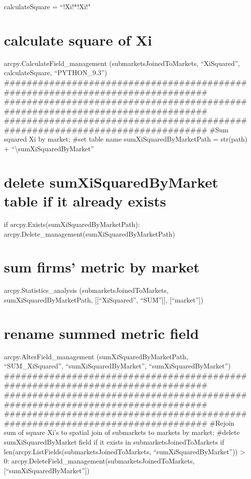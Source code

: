 \documentclass[]{article}
\begin{document}
calculateSquare = ``!Xi!*!Xi!"

\section{calculate square of Xi}\label{calculate-square-of-xi}

arcpy.CalculateField\_management (submarketsJoinedToMarkets,
``XiSquared'', calculateSquare, ``PYTHON\_9.3'')
\#\#\#\#\#\#\#\#\#\#\#\#\#\#\#\#\#\#\#\#\#\#\#\#\#\#\#\#\#\#\#\#\#\#\#\#\#\#\#\#\#\#\#\#\#\#\#\#\#\#\#\#\#\#\#\#\#\#\#\#\#\#\#\#\#\#\#\#\#\#\#\#\#\#\#\#\#\#\#
\#\#\#\#\#\#\#\#\#\#\#\#\#\#\#\#\#\#\#\#\#\#\#\#\#\#\#\#\#\#\#\#\#\#\#\#\#\#\#\#\#\#\#\#\#\#\#\#\#\#\#\#\#\#\#\#\#\#\#\#\#\#\#\#\#\#\#\#\#\#\#\#\#\#\#\#\#\#\#
\#\#\#\#\#\#\#\#\#\#\#\#\#\#\#\#\#\#\#\#\#\#\#\#\#\#\#\#\#\#\#\#\#\#\#\#\#\#\#\#\#\#\#\#\#\#\#\#\#\#\#\#\#\#\#\#\#\#\#\#\#\#\#\#\#\#\#\#\#\#\#\#\#\#\#\#\#\#\#
\#Sum squared Xi by market; \#set table name sumXiSquaredByMarketPath =
str(path) + ``\textbackslash{}sumXiSquaredByMarket''

\section{delete sumXiSquaredByMarket table if it already
exists}\label{delete-sumxisquaredbymarket-table-if-it-already-exists}

if arcpy.Exists(sumXiSquaredByMarketPath):
arcpy.Delete\_management(sumXiSquaredByMarketPath)

\section{sum firms' metric by
market}\label{sum-firms-metric-by-market-2}

arcpy.Statistics\_analysis (submarketsJoinedToMarkets,
sumXiSquaredByMarketPath, {[}{[}``XiSquared'', ``SUM''{]}{]},
{[}``market''{]})

\section{rename summed metric field}\label{rename-summed-metric-field-3}

arcpy.AlterField\_management (sumXiSquaredByMarketPath,
``SUM\_XiSquared'', ``sumXiSquaredByMarket'', ``sumXiSquaredByMarket'')
\#\#\#\#\#\#\#\#\#\#\#\#\#\#\#\#\#\#\#\#\#\#\#\#\#\#\#\#\#\#\#\#\#\#\#\#\#\#\#\#\#\#\#\#\#\#\#\#\#\#\#\#\#\#\#\#\#\#\#\#\#\#\#\#\#\#\#\#\#\#\#\#\#\#\#\#\#\#\#
\#\#\#\#\#\#\#\#\#\#\#\#\#\#\#\#\#\#\#\#\#\#\#\#\#\#\#\#\#\#\#\#\#\#\#\#\#\#\#\#\#\#\#\#\#\#\#\#\#\#\#\#\#\#\#\#\#\#\#\#\#\#\#\#\#\#\#\#\#\#\#\#\#\#\#\#\#\#\#
\#\#\#\#\#\#\#\#\#\#\#\#\#\#\#\#\#\#\#\#\#\#\#\#\#\#\#\#\#\#\#\#\#\#\#\#\#\#\#\#\#\#\#\#\#\#\#\#\#\#\#\#\#\#\#\#\#\#\#\#\#\#\#\#\#\#\#\#\#\#\#\#\#\#\#\#\#\#\#
\#Rejoin sum of square Xi's to spatial join of submarkets to markets by
market; \#delete sumXiSquaredByMarket field if it exists in
submarketsJoinedToMarkets if
len(arcpy.ListFields(submarketsJoinedToMarkets,
``sumXiSquaredByMarket'')) \textgreater{} 0:
arcpy.DeleteField\_management(submarketsJoinedToMarkets,{[}``sumXiSquaredByMarket''{]})
\end{document}
